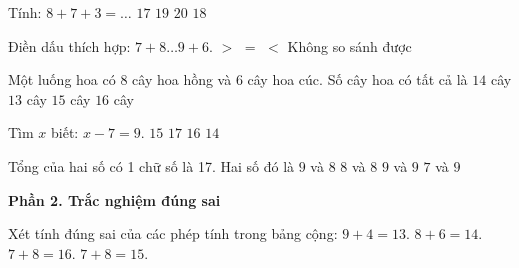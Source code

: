 \begin{ex} %
Tính: $8 + 7 + 3 = \dots$
\choice
{$17$}
{$19$}
{$20$}
{\True $18$}
\end{ex}

\begin{ex} %
Điền dấu thích hợp: $7 + 8 \dots 9 + 6$.
\choice
{$>$}
{\True $=$}
{$<$}
{Không so sánh được}
\end{ex}

\begin{ex} %
Một luống hoa có 8 cây hoa hồng và 6 cây hoa cúc. Số cây hoa có tất cả là
\choice
{\True $14$ cây}
{$13$ cây}
{$15$ cây}
{$16$ cây}
\end{ex}

\begin{ex} %
Tìm $x$ biết: $x - 7 = 9$.
\choice
{$15$}
{$17$}
{\True $16$}
{$14$}
\end{ex}

\begin{ex} %
Tổng của hai số có 1 chữ số là 17. Hai số đó là
\choice
{\True $9$ và $8$}
{$8$ và $8$}
{$9$ và $9$}
{$7$ và $9$}
\end{ex}

\textbf{Phần 2. Trắc nghiệm đúng sai}

\begin{ex} %
Xét tính đúng sai của các phép tính trong bảng cộng:
\choiceTF
{\True $9 + 4 = 13$.}
{\True $8 + 6 = 14$.}
{$7 + 8 = 16$.}
{\True $7 + 8 = 15$.}
\end{ex}

